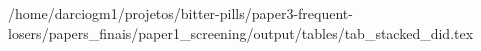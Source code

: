 /home/darciogm1/projetos/bitter-pills/paper3-frequent-losers/papers_finais/paper1_screening/output/tables/tab_stacked_did.tex